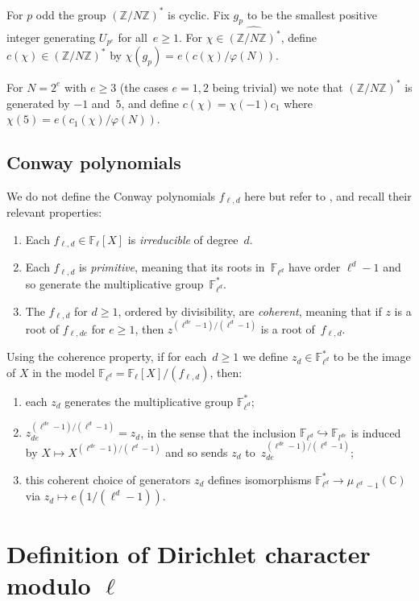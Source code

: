 \documentclass[a4paper, 10pt]{amsart}
\def\Z{{\mathbb Z}}
\def\C{{\mathbb C}}
\def\F{{\mathbb F}}
\def\Fl{{\mathbb F}_{\ell}}
\def\Fld{{\mathbb F}_{\ell^d}}
\def\ZNs{(\Z/N\Z)^*}
\def\ZNsh{\widehat{\ZNs}}
\begin{document}
For $p$ odd the group $\ZNs$ is cyclic.  Fix $g_p$ to be the smallest
positive integer generating $U_{p^e}$ for all~$e\ge1$.  For
$\chi\in\ZNsh$, define $c(\chi)\in\ZNs$ by $\chi(g_p) =
e(c(\chi)/\varphi(N))$.

For $N=2^e$ with $e\ge3$ (the cases $e=1,2$ being trivial) we note
that $\ZNs$ is generated by $-1$ and~$5$, and define
$c(\chi)=\chi(-1)c_1$ where $\chi(5) = e(c_1(\chi)/\varphi(N))$.

\subsection{Conway polynomials}
We do not define the Conway polynomials $f_{\ell,d}$ here but refer to
\cite{ConwayPol}, and recall their relevant properties:
\begin{enumerate}
\item Each $f_{\ell,d}\in\Fl[X]$ is \emph{irreducible} of degree~$d$.
\item Each $f_{\ell,d}$ is \emph{primitive}, meaning that its roots
  in~$\Fld$ have order $\ell^d-1$ and so generate the multiplicative
  group~$\Fld^*$.
\item The $f_{\ell,d}$ for $d\ge1$, ordered by divisibility, are
  \emph{coherent}, meaning that if $z$ is a root of $f_{\ell,de}$ for
  $e\ge1$, then $z^{(\ell^{de}-1)/(\ell^d-1)}$ is a root
  of~$f_{\ell,d}$.
\end{enumerate}
Using the coherence property, if for each~$d\ge1$ we define
$z_d\in\Fld^*$ to be the image of $X$ in the model $\Fld =
\Fl[X]/(f_{\ell,d})$, then:
\begin{enumerate}
\item each $z_d$ generates the multiplicative group $\Fld^*$;
\item $z_{de}^{(\ell^{de}-1)/(\ell^d-1)}=z_d$, in the sense that the
  inclusion $\Fld\hookrightarrow\F_{l^{de}}$ is induced by $X\mapsto
  X^{(\ell^{de}-1)/(\ell^d-1)}$ and so sends $z_d$
  to~$z_{de}^{(\ell^{de}-1)/(\ell^d-1)}$;
\item this coherent choice of generators $z_d$ defines isomorphisms
  $\Fld^*\to\mu_{\ell^d-1}(\C)$ via $z_d\mapsto e(1/(\ell^d-1))$.
\end{enumerate}

\section{Definition of Dirichlet character modulo $\ell$}
\end{document}
